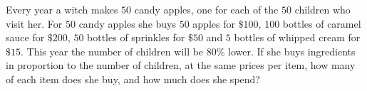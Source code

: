 Every year a witch makes $50$ candy apples, one for each of the $50$ children who visit her. For $50$ candy apples she buys $50$ apples for $\$100$, $100$ bottles of caramel sauce for $\$200$, $50$ bottles of sprinkles for $\$50$ and $5$ bottles of whipped cream for $\$15$. This year the number of children will be $80\%$ lower. If she buys ingredients in proportion to the number of children, at the same prices per item, how many of each item does she buy, and how much does she spend?
